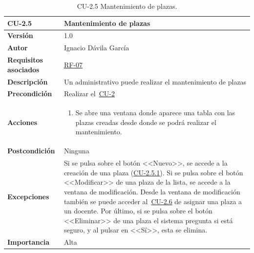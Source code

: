 \begin{table}[p]
\label{table:CU-2.5}
	\centering
	\begin{tabularx}{\linewidth}{ p{} p{} }
		\toprule
		\textbf{CU-2.5}    & \textbf{Mantenimiento de plazas}\\
		\toprule
		\textbf{Versión}              & 1.0    \\
		\textbf{Autor}                & Ignacio Dávila García \\
		\textbf{Requisitos asociados} & \hyperref[itm:RF7]{RF-07} \\
		\textbf{Descripción}          & Un administrativo puede realizar el mantenimiento de plazas \\
		\textbf{Precondición}         & Realizar el~\hyperref[table:CU-2]{CU-2} \\
		\textbf{Acciones}             &
		\begin{enumerate}
			\def\labelenumi{\arabic{enumi}.}
			\tightlist
			\item Se abre una ventana donde aparece una tabla con las plazas creadas desde donde se podrá realizar el mantenimiento.
		\end{enumerate}\\
		\textbf{Postcondición}        & Ninguna \\
		\textbf{Excepciones}          & Si se pulsa sobre el botón <<Nuevo>>, se accede a la creación de una plaza (\hyperref[table:CU-2.5.1]{CU-2.5.1}). Si se pulsa sobre el botón <<Modificar>> de una plaza de la lista, se accede a la ventana de modificación. Desde la ventana de modificación también se puede acceder al~\hyperref[table:CU-2.6]{CU-2.6} de asignar una plaza a un docente. Por último, si se pulsa sobre el botón <<Eliminar>> de una plaza el sistema pregunta si está seguro, y al pulsar en <<Sí>>, esta se elimina. \\
		\textbf{Importancia}          & Alta \\
		\bottomrule
	\end{tabularx}
	\caption{CU-2.5 Mantenimiento de plazas.}
\end{table}
\FloatBarrier

